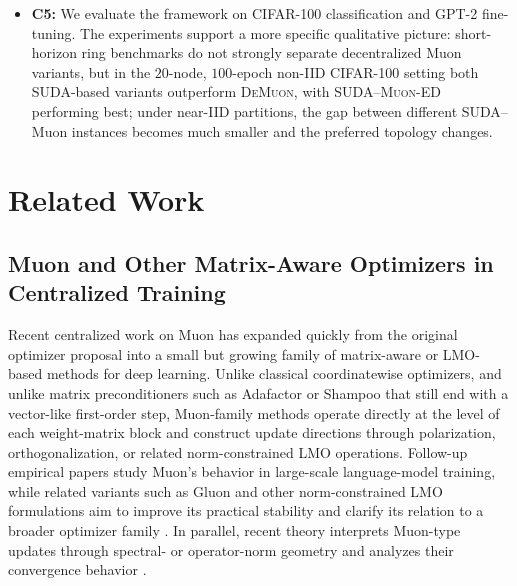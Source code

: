\documentclass{article}
\begin{document}
\begin{itemize}
    \item 
    \textbf{C5:} We evaluate the framework on CIFAR-100 classification and GPT-2 fine-tuning. The experiments support a more specific qualitative picture: short-horizon ring benchmarks do not strongly separate decentralized Muon variants, but in the $20$-node, $100$-epoch non-IID CIFAR-100 setting both SUDA-based variants outperform \textsc{DeMuon}, with \textsc{SUDA--Muon-ED} performing best; under near-IID partitions, the gap between different SUDA--Muon instances becomes much smaller and the preferred topology changes.
    
\end{itemize}


\section{Related Work}
\label{sec:related-work}

\subsection{Muon and Other Matrix-Aware Optimizers in Centralized Training}


Recent centralized work on Muon has expanded quickly from the original optimizer proposal into a small but growing family of matrix-aware or LMO-based methods for deep learning. Unlike classical coordinatewise optimizers, and unlike matrix preconditioners such as Adafactor or Shampoo that still end with a vector-like first-order step, Muon-family methods operate directly at the level of each weight-matrix block and construct update directions through polarization, orthogonalization, or related norm-constrained LMO operations. Follow-up empirical papers study Muon's behavior in large-scale language-model training, while related variants such as Gluon and other norm-constrained LMO formulations aim to improve its practical stability and clarify its relation to a broader optimizer family \citep{shazeer2018adafactor,gupta2018shampoo,jordan2024muon,liu2025muon,riabinin2025gluon,pethick2025training}. In parallel, recent theory interprets Muon-type updates through spectral- or operator-norm geometry and analyzes their convergence behavior \citep{wang2025muon,shen2025convergence}. 
\end{document}
